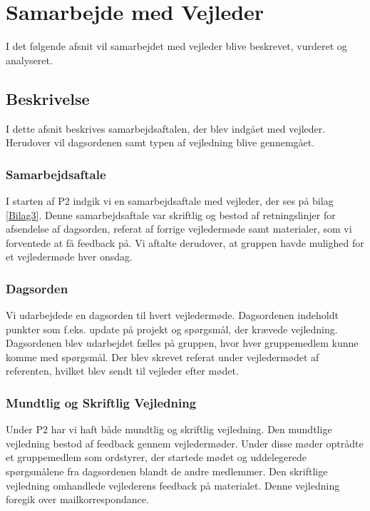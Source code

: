 \chapter{Samarbejde med Vejleder}
I det følgende afsnit vil samarbejdet med vejleder blive beskrevet, vurderet og analyseret. 

\section{Beskrivelse}
I dette afsnit beskrives samarbejdsaftalen, der blev indgået med vejleder. Herudover vil dagsordenen samt typen af vejledning blive gennemgået.

\subsection{Samarbejdsaftale}
I starten af P$2$ indgik vi en samarbejdsaftale med vejleder, der ses på bilag \ref{Bilag3}. Denne samarbejdsaftale var skriftlig og bestod af retningslinjer for afsendelse af dagsorden, referat af forrige vejledermøde samt materialer, som vi forventede at få feedback på. Vi aftalte derudover, at gruppen havde mulighed for et vejledermøde hver onsdag.

\subsection{Dagsorden}
Vi udarbejdede en dagsorden til hvert vejledermøde. Dagsordenen indeholdt punkter som f.eks. update på projekt og spørgsmål, der krævede vejledning. Dagsordenen blev udarbejdet fælles på gruppen, hvor hver gruppemedlem kunne komme med spørgsmål. Der blev skrevet referat under vejledermødet af referenten, hvilket blev sendt til vejleder efter mødet.

\subsection{Mundtlig og Skriftlig Vejledning}
Under P$2$ har vi haft både mundtlig og skriftlig vejledning. Den mundtlige vejledning bestod af feedback gennem vejledermøder. Under disse møder optrådte et gruppemedlem som ordstyrer, der startede mødet og uddelegerede spørgsmålene fra dagsordenen blandt de andre medlemmer. Den skriftlige vejledning omhandlede vejlederens feedback på materialet. Denne vejledning foregik over mailkorrespondance.

